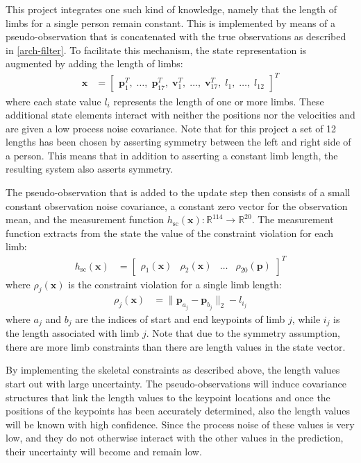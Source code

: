 This project integrates one such kind of knowledge, namely that the length of limbs for a single person remain constant. This is implemented by means of a pseudo-observation that is concatenated with the true observations as described in \cref{arch-filter}. To facilitate this mechanism, the state representation is augmented by adding the length of limbs:
\begin{align*}
    \mathbf{x} &= \begin{bmatrix} \mathbf{p}_1^T, \; \dots, \; \mathbf{p}_{17}^T, \; \mathbf{v}_1^T, \; \dots, \; \mathbf{v}_{17}^T, \; l_1, \; \dots, \; l_{12} \end{bmatrix}^T
\end{align*}
where each state value $l_i$ represents the length of one or more limbs. These additional state elements interact with neither the positions nor the velocities and are given a low process noise covariance. Note that for this project a set of 12 lengths has been chosen by asserting symmetry between the left and right side of a person. This means that in addition to asserting a constant limb length, the resulting system also asserts symmetry.

The pseudo-observation that is added to the update step then consists of a small constant observation noise covariance, a constant zero vector for the observation mean, and the measurement function $h_\mathrm{sc}(\mathbf{x}): \mathbb{R}^{114} \to \mathbb{R}^{20}$. The measurement function extracts from the state the value of the constraint violation for each limb:
\begin{align*}
    h_\mathrm{sc}(\mathbf{x}) &= \begin{bmatrix} \rho_1(\mathbf{x}) & \rho_2(\mathbf{x}) & \dots & \rho_{20}(\mathbf{p}) \end{bmatrix}^T
\end{align*}
where $\rho_j(\mathbf{x})$ is the constraint violation for a single limb length:
\begin{align*}
    \rho_j(\mathbf{x}) &= \|\mathbf{p}_{a_j} - \mathbf{p}_{b_j}\|_2 - l_{i_j}
\end{align*}
where $a_j$ and $b_j$ are the indices of start and end keypoints of limb $j$, while $i_j$ is the length associated with limb $j$. Note that due to the symmetry assumption, there are more limb constraints than there are length values in the state vector.

By implementing the skeletal constraints as described above, the length values start out with large uncertainty. The pseudo-observations will induce covariance structures that link the length values to the keypoint locations and once the positions of the keypoints has been accurately determined, also the length values will be known with high confidence. Since the process noise of these values is very low, and they do not otherwise interact with the other values in the prediction, their uncertainty will become and remain low.



